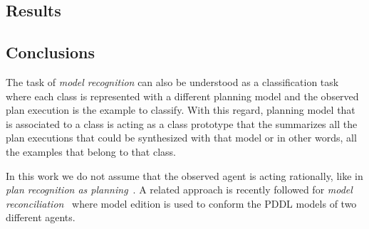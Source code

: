 \documentclass[letterpaper]{article} %
\begin{document}
\subsection{Results}

\subsection{Conclusions}
\label{sec:conclussions}
The task of {\em model recognition} can also be understood as a classification task where each class is represented with a different planning model and the observed plan execution is the example to classify. With this regard, planning model that is associated to a class is acting as a class prototype that the summarizes all the plan executions that could be synthesized with that model or in other words, all the examples that belong to that class.

In this work we do not assume that the observed agent is acting rationally, like in {\em plan recognition as planning}~\cite{ramirez2012plan,ramirez2009plan}. A related approach is recently followed for {\em model reconciliation}~\cite{Kambhampati:mreconciliation:ijcai17} where model edition is used to conform the PDDL models of two different agents. 



\end{document}
